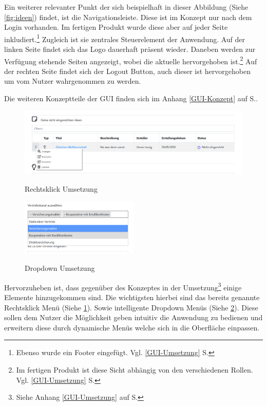 Ein weiterer relevanter Punkt der sich beispielhaft in dieser Abbildung (Siehe \cref{fig:ideen}) findet, ist die Navigationsleiste. Diese ist im Konzept nur nach dem Login vorhanden. Im fertigen Produkt wurde diese aber auf jeder Seite inkludiert.\footnote{Ebenso wurde ein Footer eingefügt. Vgl. \ref{GUI-Umsetzung} S.\pageref{GUI-Umsetzung}}
Zugleich ist sie zentrales Steuerelement der Anwendung. Auf der linken Seite findet sich das Logo dauerhaft präsent wieder. Daneben werden zur Verfügung stehende Seiten angezeigt, wobei die aktuelle hervorgehoben ist.\footnote{Im fertigen Produkt ist diese Sicht abhängig von den verschiedenen Rollen. Vgl. \ref{GUI-Umsetzung} S.\pageref{GUI-Umsetzung}} Auf der rechten Seite findet sich der Logout Button, auch dieser ist hervorgehoben um vom Nutzer wahrgenommen zu werden.

Die weiteren Konzeptteile der GUI finden sich im Anhang \ref{GUI-Konzept} auf S.\pageref{GUI-Konzept}.

\begin{figure}[hbt]
    \centering
    \begin{minipage}[t]{1\textwidth}
        \caption{Rechtsklick Umsetzung}
        \includegraphics[width=1\textwidth]{img/rechtsklick-umsetzung.png}\\
        \label{fig:rechtsklick}
    \end{minipage}
\end{figure}

\begin{figure}[hbt]
    \centering
    \begin{minipage}[t]{1\textwidth}
        \caption{Dropdown Umsetzung}
        \includegraphics[width=0.5\textwidth]{img/dropdown-umsetzung.png}\\
        \label{fig:dropdown}
    \end{minipage}
\end{figure}

Hervorzuheben ist, dass gegenüber des Konzeptes in der Umsetzung\footnote{Siehe Anhang \ref{GUI-Umsetzung} auf S.\pageref{GUI-Umsetzung}} einige Elemente hinzugekommen sind. Die wichtigsten hierbei sind das bereits genannte Rechtsklick Menü (Siehe \cref{fig:rechtsklick}). Sowie intelligente Dropdown Menüs (Siehe \cref{fig:dropdown}).
Diese sollen dem Nutzer die Möglichkeit geben intuitiv die Anwendung zu bedienen und erweitern diese durch dynamische Menüs welche sich in die Oberfläche einpassen.
